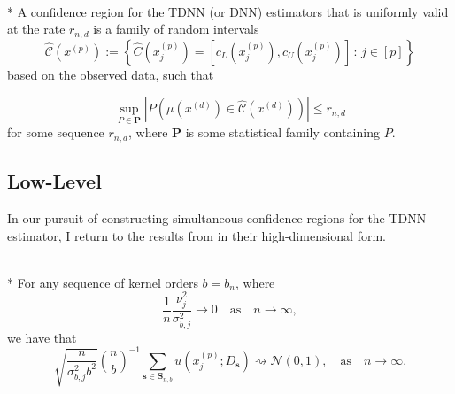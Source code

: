 \begin{boxD}
	\begin{dfn}\mbox{}\\*
		A confidence region for the TDNN (or DNN) estimators that is uniformly valid at the rate $r_{n,d}$ is a family of random intervals
		\begin{equation}
			\hat{\mathcal{C}}\left(x^{(p)}\right)
			:= \left\{\hat{C}(x^{(p)}_{j})
			= \left[c_{L}(x^{(p)}_{j}), c_{U}(x^{(p)}_{j})\right]\, : \, j \in [p]\right\}
		\end{equation}
		based on the observed data, such that
	
		\begin{equation}
			\sup_{P \in \mathbf{P}} \left| P\left(\mu(x^{(d)}) \in \hat{\mathcal{C}}\left(x^{(d)}\right)\right) \right| \leq r_{n,d}
		\end{equation}
		for some sequence $r_{n,d}$, where $\mathbf{P}$ is some statistical family containing $P$.
	\end{dfn}
\end{boxD}

\subsection{Low-Level}
In our pursuit of constructing simultaneous confidence regions for the TDNN estimator, I return to the results from \citet{ritzwoller_simultaneous_2024} in their high-dimensional form.

\begin{boxD}
	\begin{thm}\label{thm:rit4_1}\mbox{}\\*
		For any sequence of kernel orders $b=b_n$, where
		\begin{equation}
			\frac{1}{n} \frac{\nu_j^2}{\sigma_{b, j}^2} \rightarrow 0
			\quad \text{as} \quad
			n \rightarrow \infty,
		\end{equation}
		we have that
		\begin{equation}
			\sqrt{\frac{n}{\sigma_{b, j}^2 b^2}} \binom{n}{b}^{-1} \sum_{\mathbf{s} \in \mathbf{S}_{n, b}} u\left(x^{(p)}_{j} ; D_{\mathbf{s}}\right) \rightsquigarrow \mathcal{N}(0,1),
			\quad \text{as} \quad
			n \rightarrow \infty.
		\end{equation}
	\end{thm}
\end{boxD}

